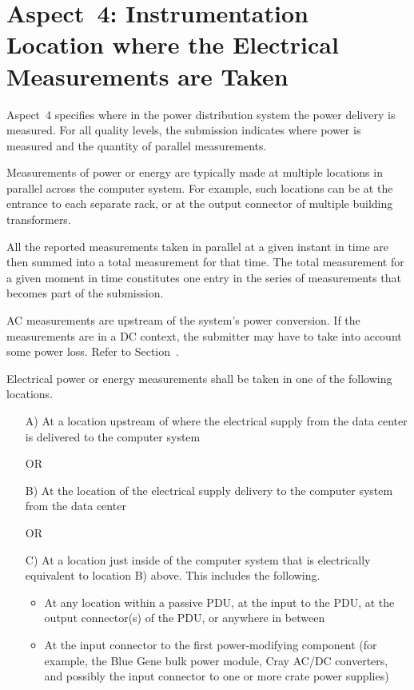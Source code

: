\section{Aspect~4: Instrumentation Location where the Electrical Measurements are Taken}
\label{sec:A4wEMaT}
Aspect~4 specifies where in the power distribution system the power delivery is measured.
For all quality levels, the submission indicates where power is measured and the quantity of parallel measurements.
\wl

\noindent
Measurements of power or energy are typically made at multiple locations in parallel across the computer system.
For example, such locations can be at the entrance to each separate rack, or at the output connector of multiple building transformers.
\wl

\noindent
All the reported measurements taken in parallel at a given instant in time are then summed into a total measurement for that time.
The total measurement for a given moment in time constitutes one entry in the series of measurements that becomes part of the submission.
\wl

\noindent
AC measurements are upstream of the system's power conversion.
If the measurements are in a DC context, the submitter may have to take into account some power loss.
Refer to Section~.
\wl

\noindent
Electrical power or energy measurements shall be taken in one of the following locations.

\begin{itemize}
\item[{A)}]
At a location upstream of where the electrical supply from the data center is delivered to the computer system

OR

\item[{B)}]
At the location of the electrical supply delivery to the computer system from the data center

OR

\item[{C)}]
At a location just inside of the computer system that is electrically equivalent to location B) above.
This includes the following.

\begin{itemize}
\item
At any location within a passive PDU, at the input to the PDU, at the output connector(s) of the PDU, or anywhere in between 
\item
At the input connector to the first power-modifying component (for example, the Blue Gene bulk power module, Cray AC/DC converters, and possibly the input connector to one or more crate power supplies)
\end{itemize}
\end{itemize}

